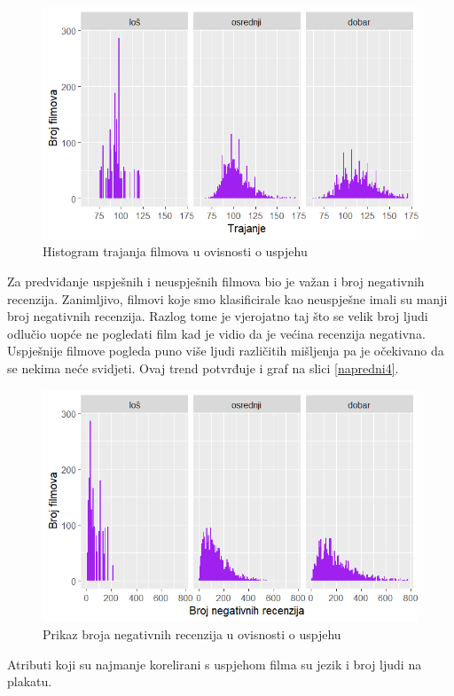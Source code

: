 \begin{figure}[H]
	\centering
	\includegraphics[width=15cm]{../figures/expl/007.png}
	\caption{Histogram trajanja filmova u ovisnosti o uspjehu}
	\label{fig:ml7}
\end{figure}

Za predviđanje uspješnih i neuspješnih filmova bio je važan i broj negativnih recenzija. Zanimljivo, filmovi koje smo klasificirale kao neuspješne imali su manji broj negativnih recenzija. Razlog tome je vjerojatno taj što se velik broj ljudi odlučio uopće ne pogledati film kad je vidio da je većina recenzija negativna. Uspješnije filmove pogleda puno više ljudi različitih mišljenja pa je očekivano da se nekima neće svidjeti. Ovaj trend potvrđuje i graf na slici \ref{napredni4}.

\begin{figure}[H]
	\centering
	\includegraphics[width=15cm]{../figures/expl/008.png}
	\caption{Prikaz broja negativnih recenzija u ovisnosti o uspjehu}
	\label{fig:ml8}
\end{figure}

Atributi koji su najmanje korelirani s uspjehom filma su jezik i broj ljudi na plakatu.

\eject
